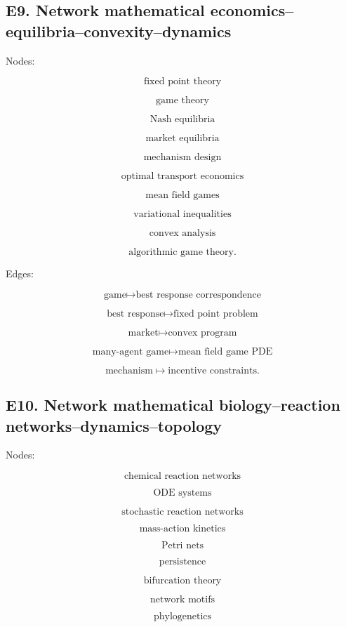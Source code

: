 \documentclass[11pt]{article}
\begin{document}
\subsection{E9. Network mathematical economics--equilibria--convexity--dynamics}

Nodes:

\[
\text{fixed point theory}
\]

\[
\text{game theory}
\]

\[
\text{Nash equilibria}
\]

\[
\text{market equilibria}
\]

\[
\text{mechanism design}
\]

\[
\text{optimal transport economics}
\]

\[
\text{mean field games}
\]

\[
\text{variational inequalities}
\]

\[
\text{convex analysis}
\]

\[
\text{algorithmic game theory}.
\]

Edges:

\[
\text{game}\mapsto \text{best response correspondence}
\]

\[
\text{best response}\mapsto \text{fixed point problem}
\]

\[
\text{market}\mapsto \text{convex program}
\]

\[
\text{many-agent game}\mapsto \text{mean field game PDE}
\]

\[
\text{mechanism}\mapsto \text{incentive constraints}.
\]



\subsection{E10. Network mathematical biology--reaction networks--dynamics--topology}

Nodes:

\[
\text{chemical reaction networks}
\]

\[
\text{ODE systems}
\]

\[
\text{stochastic reaction networks}
\]

\[
\text{mass-action kinetics}
\]

\[
\text{Petri nets}
\]

\[
\text{persistence}
\]

\[
\text{bifurcation theory}
\]

\[
\text{network motifs}
\]

\[
\text{phylogenetics}
\]
\end{document}
